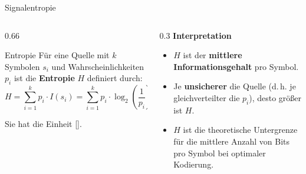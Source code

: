 \begin{frame}{Signalentropie}
\small
\begin{columns}
  \begin{column}{0.66\textwidth}

    \begin{blockDef}{\small Entropie}
    Für eine Quelle mit \(k\) Symbolen \(s_i\) und Wahrscheinlichkeiten \(p_i\) ist die \textbf{Entropie} \(H\) definiert durch:
    \[
      H
      = \sum_{i=1}^{k} p_i \cdot I(s_i)
      = \sum_{i=1}^{k} p_i \cdot \log_2\!\left(\frac{1}{p_i}\right)
      = - \sum_{i=1}^{k} p_i \cdot \log_2(p_i)
    \]

    Sie hat die Einheit [].
    \end{blockDef}
  \end{column}

  \begin{column}{0.3\textwidth}
    \textbf{Interpretation}

    \begin{itemize}
      \item \(H\) ist der \textbf{mittlere Informationsgehalt} pro Symbol.
      \item Je \textbf{unsicherer} die Quelle (d.\,h. je gleichverteilter die \(p_i\)),
            desto größer ist \(H\).
      \item \(H\) ist die theoretische Untergrenze für die mittlere Anzahl
            von Bits pro Symbol bei optimaler Kodierung.
    \end{itemize}
  \end{column}
\end{columns}
\end{frame}

